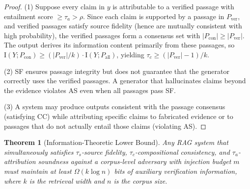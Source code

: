 \documentclass[journal,10pt]{IEEEtran}
\newtheorem{theorem}{Theorem}
\newcommand{\MI}{\mathrm{I}}
\begin{document}
\begin{proof}
(1) Suppose every claim in $y$ is attributable to a verified passage with entailment score $\geq \tau_a > \rho$. Since each claim is supported by a passage in $P_{\text{ver}}$, and verified passages satisfy source fidelity (hence are mutually consistent with high probability), the verified passages form a consensus set with $|P_{\text{con}}| \geq |P_{\text{ver}}|$. The output derives its information content primarily from these passages, so $\MI(Y; P_{\text{con}}) \geq (|P_{\text{ver}}|/k) \cdot \MI(Y; P_{\text{all}})$, yielding $\tau_c \geq (|P_{\text{ver}}| - 1)/k$.

(2) SF ensures passage integrity but does not guarantee that the generator correctly uses the verified passages. A generator that hallucinates claims beyond the evidence violates AS even when all passages pass SF.

(3) A system may produce outputs consistent with the passage consensus (satisfying CC) while attributing specific claims to fabricated evidence or to passages that do not actually entail those claims (violating AS).
\end{proof}

\begin{theorem}[Information-Theoretic Lower Bound]\label{thm:lower_bound}
Any RAG system that simultaneously satisfies $\tau_s$-source fidelity, $\tau_c$-compositional consistency, and $\tau_a$-attribution soundness against a corpus-level adversary with injection budget $m$ must maintain at least $\Omega(k \log n)$ bits of auxiliary verification information, where $k$ is the retrieval width and $n$ is the corpus size.
\end{theorem}
\end{document}
